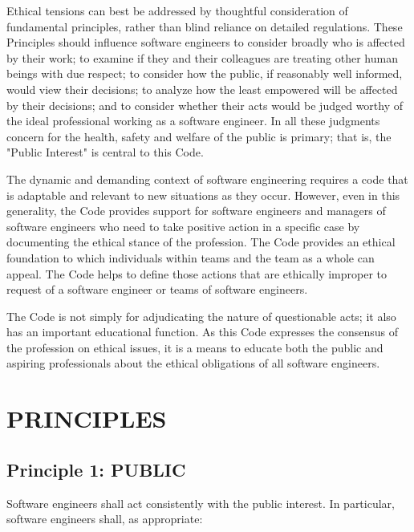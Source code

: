 Ethical tensions can best be addressed by thoughtful consideration of
fundamental principles, rather than blind reliance on detailed regulations.
These Principles should influence software engineers to consider broadly who is
affected by their work; to examine if they and their colleagues are treating
other human beings with due respect; to consider how the public, if reasonably
well informed, would view their decisions; to analyze how the least empowered
will be affected by their decisions; and to consider whether their acts would
be judged worthy of the ideal professional working as a software engineer. In
all these judgments concern for the health, safety and welfare of the public is
primary; that is, the "Public Interest" is central to this Code.

The dynamic and demanding context of software engineering requires a code that
is adaptable and relevant to new situations as they occur. However, even in
this generality, the Code provides support for software engineers and managers
of software engineers who need to take positive action in a specific case by
documenting the ethical stance of the profession. The Code provides an ethical
foundation to which individuals within teams and the team as a whole can
appeal. The Code helps to define those actions that are ethically improper to
request of a software engineer or teams of software engineers.

The Code is not simply for adjudicating the nature of questionable acts; it
also has an important educational function. As this Code expresses the
consensus of the profession on ethical issues, it is a means to educate both
the public and aspiring professionals about the ethical obligations of all
software engineers.

\section{PRINCIPLES}

\subsection*{Principle 1: PUBLIC}
Software engineers shall act consistently with the public interest. In
particular, software engineers shall, as appropriate:

